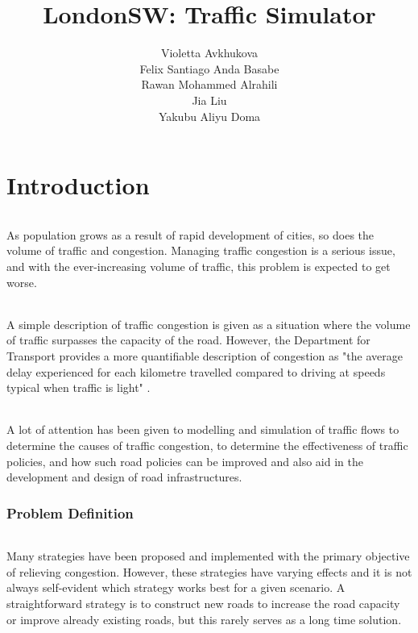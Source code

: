 \documentclass[a4paper,11pt,titlepage]{article}
\begin{document}
\title{LondonSW: Traffic Simulator}
\author{Violetta Avkhukova\\Felix Santiago Anda Basabe\\Rawan Mohammed Alrahili\\Jia Liu\\Yakubu Aliyu Doma}
\maketitle
\tableofcontents
\newpage

\part{Introduction}
\paragraph{}
As population grows as a result of rapid development of cities, so does the volume of traffic and congestion. Managing traffic congestion is a serious issue, and with the ever-increasing volume of traffic, this problem is expected to get worse.
\paragraph{}
A simple description of traffic congestion is given as a situation where the volume of traffic surpasses the capacity of the road. However, the Department for Transport provides a more quantifiable description of congestion as "the average delay experienced for each kilometre travelled compared to driving at speeds typical when traffic is light" \cite{2}.
\paragraph{}
A lot of attention has been given to modelling and simulation of traffic flows to determine the causes of traffic congestion, to determine the effectiveness of traffic policies, and how such road policies can be improved and also aid in the development and design of road infrastructures.

\section{Problem Definition}
\paragraph{}
Many strategies have been proposed and implemented with the primary objective of relieving congestion. However, these strategies have varying effects and it is not always self-evident which strategy works best for a given scenario. A straightforward strategy is to construct new roads to increase the road capacity or improve already existing roads, but this rarely serves as a long time solution.
\end{document}
